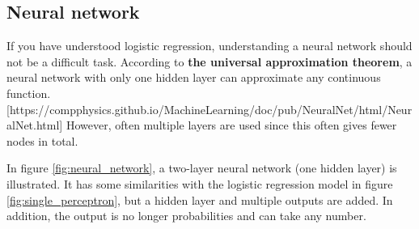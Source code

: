 \subsection{Neural network}
If you have understood logistic regression, understanding a neural network should not be a difficult task. According to  \textbf{the universal approximation theorem}, a neural network with only one hidden layer can approximate any continuous function. [https://compphysics.github.io/MachineLearning/doc/pub/NeuralNet/html/NeuralNet.html] However, often multiple layers are used since this often gives fewer nodes in total. 

In figure \eqref{fig:neural_network}, a two-layer neural network (one hidden layer) is illustrated. It has some similarities with the logistic regression model in figure \eqref{fig:single_perceptron}, but a hidden layer and multiple outputs are added. In addition, the output is no longer probabilities and can take any number. 

